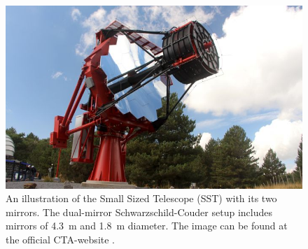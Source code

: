 \begin{figure}
		\centering
		\captionsetup{width=0.9\linewidth}
		\includegraphics[width=.9\textwidth]{images/sst.jpg}
		\caption{An illustration of the Small Sized Telescope (SST) with its
		two mirrors.
		The dual-mirror Schwarzschild-Couder setup includes mirrors of
		\SI{4.3}{\meter} and \SI{1.8}{\meter} diameter.
		The image can be found at the official CTA-website \cite{cta_web}.}
		\label{fig:sst}
\end{figure}